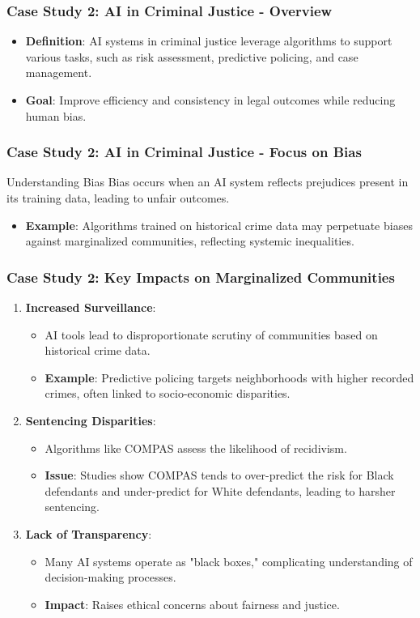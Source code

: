 \documentclass[aspectratio=169]{beamer}
\begin{document}
\begin{frame}[fragile]
  \frametitle{Case Study 2: AI in Criminal Justice - Overview}
  \begin{itemize}
    \item \textbf{Definition}: AI systems in criminal justice leverage algorithms to support various tasks, such as risk assessment, predictive policing, and case management.
    \item \textbf{Goal}: Improve efficiency and consistency in legal outcomes while reducing human bias.
  \end{itemize}
\end{frame}

\begin{frame}[fragile]
  \frametitle{Case Study 2: AI in Criminal Justice - Focus on Bias}
  \begin{block}{Understanding Bias}
    Bias occurs when an AI system reflects prejudices present in its training data, leading to unfair outcomes.
    \begin{itemize}
      \item \textbf{Example}: Algorithms trained on historical crime data may perpetuate biases against marginalized communities, reflecting systemic inequalities.
    \end{itemize}
  \end{block}
\end{frame}

\begin{frame}[fragile]
  \frametitle{Case Study 2: Key Impacts on Marginalized Communities}
  \begin{enumerate}
    \item \textbf{Increased Surveillance}:
      \begin{itemize}
        \item AI tools lead to disproportionate scrutiny of communities based on historical crime data.
        \item \textbf{Example}: Predictive policing targets neighborhoods with higher recorded crimes, often linked to socio-economic disparities.
      \end{itemize}
    \item \textbf{Sentencing Disparities}:
      \begin{itemize}
        \item Algorithms like COMPAS assess the likelihood of recidivism.
        \item \textbf{Issue}: Studies show COMPAS tends to over-predict the risk for Black defendants and under-predict for White defendants, leading to harsher sentencing.
      \end{itemize}
    \item \textbf{Lack of Transparency}:
      \begin{itemize}
        \item Many AI systems operate as "black boxes," complicating understanding of decision-making processes.
        \item \textbf{Impact}: Raises ethical concerns about fairness and justice.
      \end{itemize}
  \end{enumerate}
\end{frame}
\end{document}
